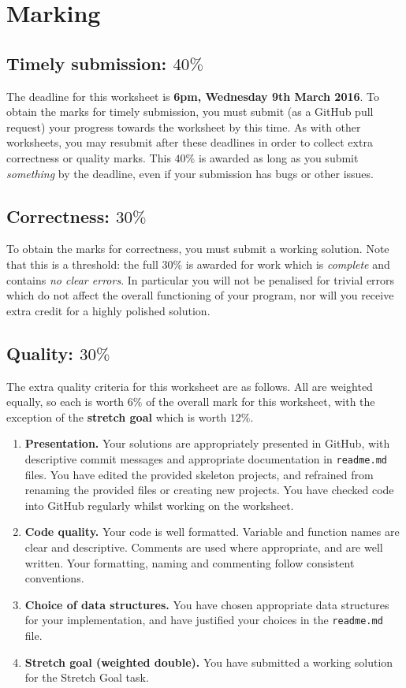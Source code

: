\documentclass{scrartcl}
\begin{document}
\section*{Marking}

\subsection*{Timely submission: $40\%$}

The deadline for this worksheet is \textbf{6pm, Wednesday 9th March 2016}.
To obtain the marks for timely submission, you must submit (as a GitHub pull request) your progress towards the worksheet by this time.
As with other worksheets, you may resubmit after these deadlines in order to collect extra correctness or quality marks.
This $40\%$ is awarded as long as you submit \emph{something} by the deadline,
even if your submission has bugs or other issues.

\subsection*{Correctness: $30\%$}

To obtain the marks for correctness, you must submit a working solution.
Note that this is a threshold: the full $30\%$ is awarded for work which is \emph{complete}
and contains \emph{no clear errors}. In particular you will not be penalised for trivial errors which do not
affect the overall functioning of your program, nor will you receive extra credit for a highly polished solution.

\subsection*{Quality: $30\%$}

The extra quality criteria for this worksheet are as follows. All are weighted equally, so each is worth $6\%$ of the overall mark for this worksheet, with the exception of the \textbf{stretch goal} which is worth $12\%$.
\begin{enumerate}
\item\textbf{Presentation.} Your solutions are appropriately presented in GitHub, with descriptive commit messages
	and appropriate documentation in \texttt{readme.md} files.
	You have edited the provided skeleton projects, and refrained from renaming the provided files or creating new projects.
    You have checked code into GitHub regularly whilst working on the worksheet.
\item\textbf{Code quality.} Your code is well formatted.
    Variable and function names are clear and descriptive.
    Comments are used where appropriate, and are well written.
    Your formatting, naming and commenting follow consistent conventions.
\item\textbf{Choice of data structures.} You have chosen appropriate data structures for your implementation,
    and have justified your choices in the \texttt{readme.md} file.
\item\textbf{Stretch goal (weighted double).} You have submitted a working solution for the Stretch Goal task.
\end{enumerate}
\end{document}
